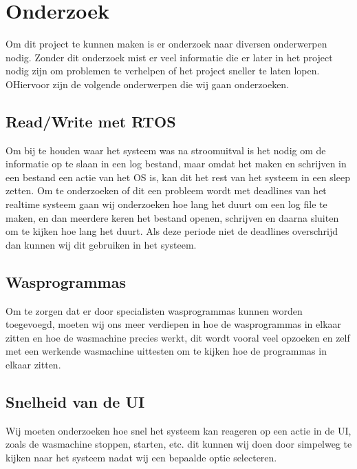 \chapter{Onderzoek}
Om dit project te kunnen maken is er onderzoek naar diversen onderwerpen nodig. Zonder dit onderzoek mist er veel informatie die er later in het project nodig zijn om problemen te verhelpen of het project sneller te laten lopen.
OHiervoor zijn de volgende onderwerpen die wij gaan onderzoeken.
\section {Read/Write met RTOS}
Om bij te houden waar het systeem was na stroomuitval is het nodig om de informatie op te slaan in een log bestand, maar omdat het maken en schrijven in een 
bestand een actie van het OS is, kan dit het rest van het systeem in een sleep zetten. Om te onderzoeken of dit een probleem wordt met deadlines van het realtime systeem gaan wij 
onderzoeken hoe lang het duurt om een log file te maken, en dan meerdere keren het bestand openen, schrijven en daarna sluiten om te kijken hoe lang het duurt. Als deze periode niet de 
deadlines overschrijd dan kunnen wij dit gebruiken in het systeem.

\section{Wasprogrammas}
Om te zorgen dat er door specialisten wasprogrammas kunnen worden toegevoegd, moeten wij ons meer verdiepen in hoe de wasprogrammas in elkaar zitten en hoe de 
wasmachine precies werkt, dit wordt vooral veel opzoeken en zelf met een werkende wasmachine uittesten om te kijken hoe de programmas in elkaar zitten.

\section{Snelheid van de UI}
Wij moeten onderzoeken hoe snel het systeem kan reageren op een actie in de UI, zoals de wasmachine stoppen, starten, etc. dit kunnen wij doen door simpelweg te 
kijken naar het systeem nadat wij een bepaalde optie selecteren. 

